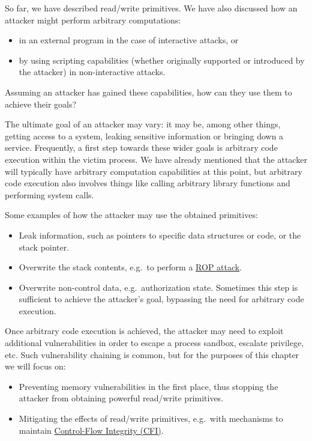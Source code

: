 \documentclass[
  a4paper,
]{report}
\providecommand{\tightlist}{%
  \setlength{\itemsep}{0pt}\setlength{\parskip}{0pt}}
\begin{document}
So far, we have described read/write primitives. We have also discussed
how an attacker might perform arbitrary computations:

\begin{itemize}
\tightlist
\item
  in an external program in the case of interactive attacks, or
\item
  by using scripting capabilities (whether originally supported or
  introduced by the attacker) in non-interactive attacks.
\end{itemize}

Assuming an attacker has gained these capabilities, how can they use
them to achieve their goals?

The ultimate goal of an attacker may vary: it may be, among other
things, getting access to a system, leaking sensitive information or
bringing down a service. Frequently, a first step towards these wider
goals is \label{__index_entry_10}{arbitrary code
execution} within the victim process. We
have already mentioned that the attacker will typically have arbitrary
computation capabilities at this point, but arbitrary code execution
also involves things like calling arbitrary library functions and
performing system calls.

Some examples of how the attacker may use the obtained primitives:

\begin{itemize}
\tightlist
\item
  Leak information, such as pointers to specific data structures or
  code, or the stack pointer.
\item
  Overwrite the stack contents, e.g.~to perform a
  \hyperref[return-oriented-programming]{ROP attack}.
\item
  Overwrite non-control data, e.g.~authorization state. Sometimes this
  step is sufficient to achieve the attacker's goal, bypassing the need
  for arbitrary code execution.
\end{itemize}

Once arbitrary code execution is achieved, the attacker may need to
exploit additional vulnerabilities in order to escape a process sandbox,
escalate privilege, etc. Such vulnerability chaining is common, but for
the purposes of this chapter we will focus on:

\begin{itemize}
\tightlist
\item
  Preventing memory vulnerabilities in the first place, thus stopping
  the attacker from obtaining powerful read/write primitives.
\item
  Mitigating the effects of read/write primitives, e.g.~with mechanisms
  to maintain \hyperref[control-flow-integrity-cfi]{Control-Flow
  Integrity (CFI)}.
\end{itemize}
\end{document}
